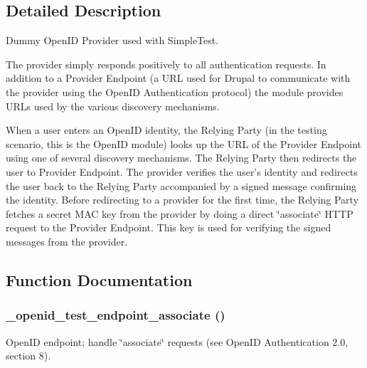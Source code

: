 \subsection{Detailed Description}
Dummy OpenID Provider used with SimpleTest.

The provider simply responds positively to all authentication requests. In addition to a Provider Endpoint (a URL used for Drupal to communicate with the provider using the OpenID Authentication protocol) the module provides URLs used by the various discovery mechanisms.

When a user enters an OpenID identity, the Relying Party (in the testing scenario, this is the OpenID module) looks up the URL of the Provider Endpoint using one of several discovery mechanisms. The Relying Party then redirects the user to Provider Endpoint. The provider verifies the user's identity and redirects the user back to the Relying Party accompanied by a signed message confirming the identity. Before redirecting to a provider for the first time, the Relying Party fetches a secret MAC key from the provider by doing a direct \char`\"{}associate\char`\"{} HTTP request to the Provider Endpoint. This key is used for verifying the signed messages from the provider. 

\subsection{Function Documentation}
\hypertarget{openid__test_8module_abcc42b34b663243bde0ea93fea7d5b2c}{
\subsubsection[{\_\-openid\_\-test\_\-endpoint\_\-associate}]{\setlength{\rightskip}{0pt plus 5cm}\_\-openid\_\-test\_\-endpoint\_\-associate ()}}
\label{openid__test_8module_abcc42b34b663243bde0ea93fea7d5b2c}
OpenID endpoint; handle \char`\"{}associate\char`\"{} requests (see OpenID Authentication 2.0, section 8).

